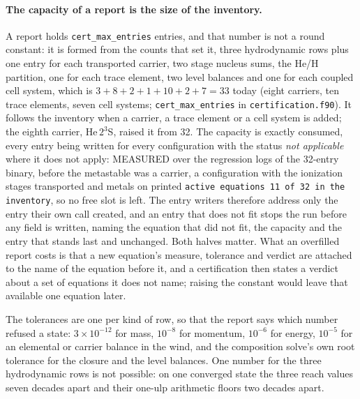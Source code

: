 \paragraph{The capacity of a report is the size of the inventory.}
A report holds \texttt{cert\_max\_entries} entries, and that number is not a
round constant: it is formed from the counts that set it, three hydrodynamic
rows plus one entry for each transported carrier, two stage nucleus sums, the
He/H partition, one for each trace element, two level balances and one for
each coupled cell system, which is $3 + 8 + 2 + 1 + 10 + 2 + 7 = 33$ today
(eight carriers, ten trace elements, seven cell systems;
\texttt{cert\_max\_entries} in \texttt{certification.f90}).  It follows the
inventory when a carrier, a trace element or a cell system is added; the
eighth carrier, He\,$2^3$S, raised it from 32.  The capacity is exactly
consumed, every entry being written for every configuration with the status
\emph{not applicable} where it does not apply: MEASURED over the regression
logs of the 32-entry binary, before the metastable was a carrier, a
configuration with the ionization stages transported and metals on printed
\texttt{active equations 11 of 32 in the inventory}, so no free slot is left.
The entry writers therefore address only the entry their own call created,
and an entry that does not fit stops the run before any field is written,
naming the equation that did not fit, the capacity and the entry that stands
last and unchanged.  Both halves matter.  What an overfilled report costs is
that a new equation's measure, tolerance and verdict are attached to the name
of the equation before it, and a certification then states a verdict about a
set of equations it does not name; raising the constant would leave that
available one equation later.

The tolerances are one per kind of row, so that the report says which number
refused a state:
$3\times10^{-12}$ for mass, $10^{-8}$ for momentum, $10^{-6}$ for energy,
$10^{-5}$ for an elemental or carrier balance in the wind, and the
composition solve's own root tolerance for the closure and the level
balances.  One number for the three hydrodynamic rows is not possible: on one
converged state the three reach values seven decades apart and their one-ulp
arithmetic floors two decades apart.

